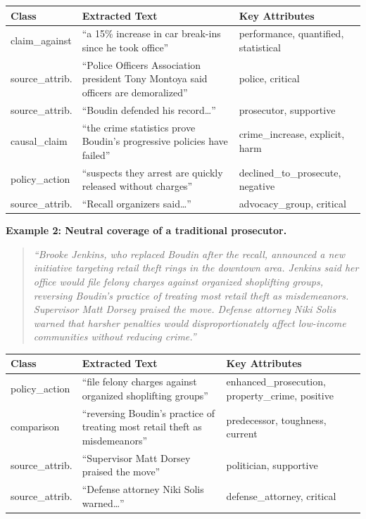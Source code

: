 \documentclass[12pt, letterpaper]{article}
\begin{document}
\begin{appendices}
\begin{table}[H]
\centering\small
\begin{tabular}{p{2.8cm}p{6.5cm}p{4.5cm}}
\toprule
Class & Extracted Text & Key Attributes \\
\midrule
claim\_against & ``a 15\% increase in car break-ins since he took office'' & performance, quantified, statistical \\
source\_attrib. & ``Police Officers Association president Tony Montoya said officers are demoralized'' & police, critical \\
source\_attrib. & ``Boudin defended his record\ldots'' & prosecutor, supportive \\
causal\_claim & ``the crime statistics prove Boudin's progressive policies have failed'' & crime\_increase, explicit, harm \\
policy\_action & ``suspects they arrest are quickly released without charges'' & declined\_to\_prosecute, negative \\
source\_attrib. & ``Recall organizers said\ldots'' & advocacy\_group, critical \\
\bottomrule
\end{tabular}
\end{table}

\noindent\textbf{Example 2: Neutral coverage of a traditional prosecutor.}
\begin{quote}\small
\emph{``Brooke Jenkins, who replaced Boudin after the recall, announced a new initiative targeting retail theft rings in the downtown area. Jenkins said her office would file felony charges against organized shoplifting groups, reversing Boudin's practice of treating most retail theft as misdemeanors. Supervisor Matt Dorsey praised the move. Defense attorney Niki Solis warned that harsher penalties would disproportionately affect low-income communities without reducing crime.''}
\end{quote}

\begin{table}[H]
\centering\small
\begin{tabular}{p{2.8cm}p{6.5cm}p{4.5cm}}
\toprule
Class & Extracted Text & Key Attributes \\
\midrule
policy\_action & ``file felony charges against organized shoplifting groups'' & enhanced\_prosecution, property\_crime, positive \\
comparison & ``reversing Boudin's practice of treating most retail theft as misdemeanors'' & predecessor, toughness, current \\
source\_attrib. & ``Supervisor Matt Dorsey praised the move'' & politician, supportive \\
source\_attrib. & ``Defense attorney Niki Solis warned\ldots'' & defense\_attorney, critical \\
\bottomrule
\end{tabular}
\end{table}


\end{appendices}
\end{document}
